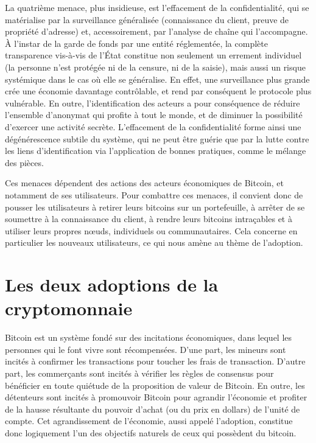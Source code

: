 La quatrième menace, plus insidieuse, est l'effacement de la confidentialité, qui se matérialise par la surveillance généralisée (connaissance du client, preuve de propriété d'adresse) et, accessoirement, par l'analyse de chaîne qui l'accompagne. À l'instar de la garde de fonds par une entité réglementée, la complète transparence vis-à-vis de l'État constitue non seulement un errement individuel (la personne n'est protégée ni de la censure, ni de la saisie), mais aussi un risque systémique dans le cas où elle se généralise. En effet, une surveillance plus grande crée une économie davantage contrôlable, et rend par conséquent le protocole plus vulnérable. En outre, l'identification des acteurs a pour conséquence de réduire l'ensemble d'anonymat qui profite à tout le monde, et de diminuer la possibilité d'exercer une activité secrète. L'effacement de la confidentialité forme ainsi une dégénérescence subtile du système, qui ne peut être guérie que par la lutte contre les liens d'identification via l'application de bonnes pratiques, comme le mélange des pièces. %

Ces menaces dépendent des actions des acteurs économiques de Bitcoin, et notamment de ses utilisateurs. Pour combattre ces menaces, il convient donc de pousser les utilisateurs à retirer leurs bitcoins sur un portefeuille, à arrêter de se soumettre à la connaissance du client, à rendre leurs bitcoins intraçables et à utiliser leurs propres nœuds, individuels ou communautaires. Cela concerne en particulier les nouveaux utilisateurs, ce qui nous amène au thème de l'adoption.

\section*{Les deux adoptions de la cryptomonnaie}

Bitcoin est un système fondé sur des incitations économiques, dans lequel les personnes qui le font vivre sont récompensées. D'une part, les mineurs sont incités à confirmer les transactions pour toucher les frais de transaction. D'autre part, les commerçants sont incités à vérifier les règles de consensus pour bénéficier en toute quiétude de la proposition de valeur de Bitcoin. En outre, les détenteurs sont incités à promouvoir Bitcoin pour agrandir l'économie et profiter de la hausse résultante du pouvoir d'achat (ou du prix en dollars) de l'unité de compte. Cet agrandissement de l'économie, aussi appelé l'adoption, constitue donc logiquement l'un des objectifs naturels de ceux qui possèdent du bitcoin.

